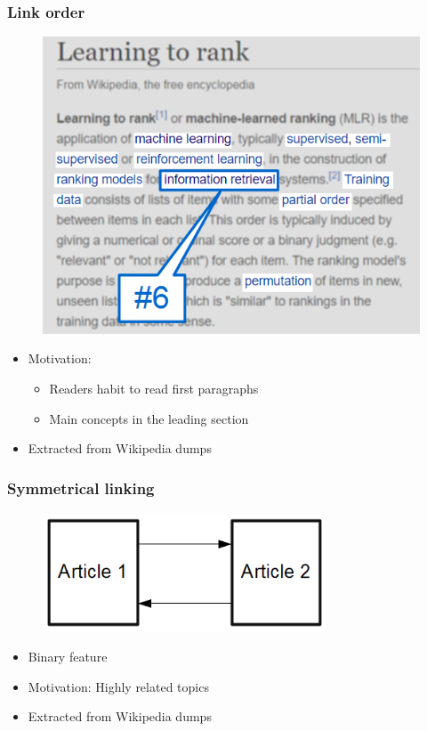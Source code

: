 \begin{frame}
  \frametitle{Link order}
      \begin{figure}[h]
   \includegraphics[height=0.6\textheight]{images/link_order}
  \end{figure}
  \begin{itemize}
    \item Motivation:
    \begin{itemize}
     \item Readers habit to read first paragraphs
     \item Main concepts in the leading section
	\end{itemize}
    \item Extracted from Wikipedia dumps
  \end{itemize}
\end{frame}

\begin{frame}
  \frametitle{Symmetrical linking}
  
  \begin{figure}[h]
   \includegraphics[width=0.75\textwidth]{images/symmetry}
  \end{figure}
  
   \begin{itemize}
   \item Binary feature
   \item Motivation: Highly related topics 
   \item Extracted from Wikipedia dumps
   \end{itemize}

\end{frame}

